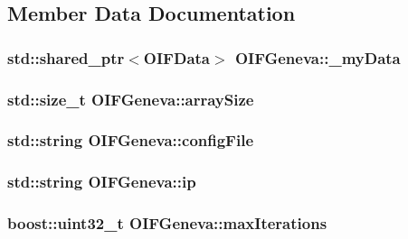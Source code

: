 \subsection{Member Data Documentation}
\hypertarget{classOIFGeneva_a6f384385ad5eebc149aa9cc84665c271}{
\subsubsection[{\_\-myData}]{\setlength{\rightskip}{0pt plus 5cm}std::shared\_\-ptr$<${\bf OIFData}$>$ {\bf OIFGeneva::\_\-myData}}}
\label{d4/dce/classOIFGeneva_a6f384385ad5eebc149aa9cc84665c271}
\hypertarget{classOIFGeneva_ae17ccd19943bfe1ced5f7b0373c36ee9}{
\subsubsection[{arraySize}]{\setlength{\rightskip}{0pt plus 5cm}std::size\_\-t {\bf OIFGeneva::arraySize}}}
\label{d4/dce/classOIFGeneva_ae17ccd19943bfe1ced5f7b0373c36ee9}
\hypertarget{classOIFGeneva_abf5610433384454ae4884b2f17f01f01}{
\subsubsection[{configFile}]{\setlength{\rightskip}{0pt plus 5cm}std::string {\bf OIFGeneva::configFile}}}
\label{d4/dce/classOIFGeneva_abf5610433384454ae4884b2f17f01f01}
\hypertarget{classOIFGeneva_a24b10918d314755d3c566ea8c17b2bc1}{
\subsubsection[{ip}]{\setlength{\rightskip}{0pt plus 5cm}std::string {\bf OIFGeneva::ip}}}
\label{d4/dce/classOIFGeneva_a24b10918d314755d3c566ea8c17b2bc1}
\hypertarget{classOIFGeneva_ae2a0cd2de953edc56ffa0dbb743fc9af}{
\subsubsection[{maxIterations}]{\setlength{\rightskip}{0pt plus 5cm}boost::uint32\_\-t {\bf OIFGeneva::maxIterations}}}
